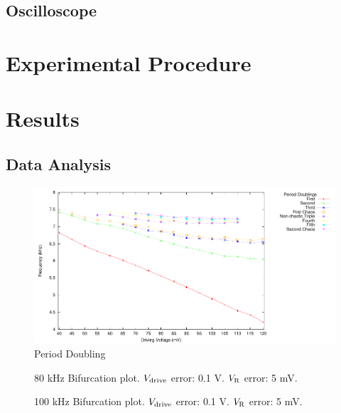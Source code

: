 \documentclass[12pt]{report}
\begin{document}
\section{Oscilloscope}
\label{sec:Oscilloscope}


\chapter{Experimental Procedure}


\chapter{Results}

\section{Data Analysis} %
\label{sec:Data Analysis}

	\begin{figure}[h]
		\centering
		\includegraphics{plots/general.pdf}
		\caption{Period Doubling}
		\label{fig:periodDoubling}
	\end{figure}



	\begin{figure}[h]
		\centering
		
		\caption{80 kHz Bifurcation plot. $V_{\rm drive}$ error: 0.1 V. $V_{\rm R}$ error: 5 mV.}
		\label{fig:80khzBifurcation}
	\end{figure}

	\begin{figure}[h]
		\centering
		
		\caption{100 kHz Bifurcation plot. $V_{\rm drive}$ error: 0.1 V. $V_{\rm R}$ error: 5 mV.}
		\label{fig:100khzBifurcation}
	\end{figure}
	
\end{document}
